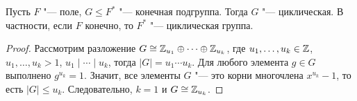 \begin{corollary}
	Пусть $F$ "--- поле, $G \le F^*$ "--- конечная подгруппа. Тогда $G$ "--- циклическая. В частности, если $F$ конечно, то $F^*$ "--- циклическая группа.
\end{corollary}

\begin{proof}
	Рассмотрим разложение $G \cong \mathbb{Z}_{u_1} \oplus \dots \oplus \mathbb{Z}_{u_k}$, где $u_1, \dotsc, u_k \in \mathbb{Z}$, $u_1, \dotsc, u_k > 1$, $u_1 \mid \dotsb \mid u_k$, тогда $|G| = u_1\dotsm u_k$. Для любого элемента $g \in G$ выполнено $g^{u_k} = 1$. Значит, все элементы $G$ "--- это корни многочлена $x^{u_k} - 1$, то есть $|G| \le u_k$. Следовательно, $k = 1$ и $G \cong \mathbb{Z}_{u_k}$.
\end{proof}